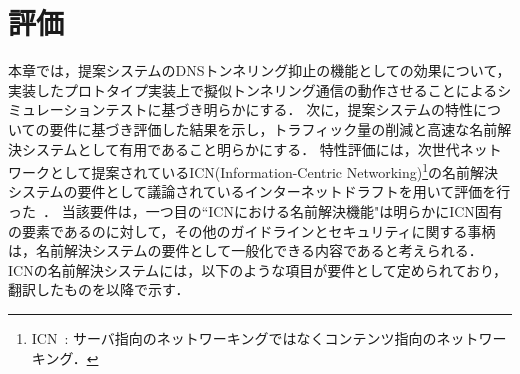 \section{評価}
\label{sec:evaluation}
本章では，提案システムのDNSトンネリング抑止の機能としての効果について，実装したプロトタイプ実装上で擬似トンネリング通信の動作させることによるシミュレーションテストに基づき明らかにする．
次に，提案システムの特性についての要件に基づき評価した結果を示し，トラフィック量の削減と高速な名前解決システムとして有用であること明らかにする．
特性評価には，次世代ネットワークとして提案されているICN(Information-Centric Networking)\footnote{ICN : サーバ指向のネットワーキングではなくコンテンツ指向のネットワーキング．}の名前解決システムの要件として議論されているインターネットドラフトを用いて評価を行った~\cite{irtf-icnrg-nrs-requirements-03}．
当該要件は，一つ目の``ICNにおける名前解決機能"は明らかにICN固有の要素であるのに対して，その他のガイドラインとセキュリティに関する事柄は，名前解決システムの要件として一般化できる内容であると考えられる．
ICNの名前解決システムには，以下のような項目が要件として定められており，翻訳したものを以降で示す．

